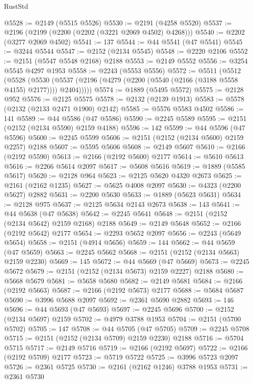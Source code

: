 \begin{lexlean}{RustStd}
\begin{coremodule}
@5528 := @2149 (@5515 @5526)
@5530 := @2191 (@4258 @5520)
@5537 := @2196 (@2199 (@2200 (@2202 (@3221 @2069 @4502) @4268)))
@5540 := @2202 (@3277 @2069 @4502)
@5541 := 137
@5544 := @44 @5541 (@47 @5541)
@5545 := @3244 @5544
@5547 := @2152 (@2134 @5545)
@5548 := @2220 @2106
@5552 := @2151 (@5547 @5548 @2168) @2188
@5553 := @2149 @5552
@5556 := @3254 @5545 @4297 @1953
@5558 := @2243 (@5553 @5556)
@5572 := @5511
    (@5512
      (@5528
        (@5530 (@5537 (@2196 (@4279 (@2200 (@5540 (@2166 (@3188 @5558 @4155) @2177)))) @2404)))))
@5574 := @1889 (@5495 @5572)
@5575 := @2128 @952
@5576 := @2125 @5575
@5578 := @2132 (@2139 @1913)
@5583 := @5578 (@2132 (@2133 @2471 @1900) @2142)
@5585 := @5576 @5583 @4502
@5586 := 141
@5589 := @44 @5586 (@47 @5586)
@5590 := @2245 @5589
@5595 := @2151 (@2152 (@2134 @5590) @2159 @4188)
@5596 := 142
@5599 := @44 @5596 (@47 @5596)
@5600 := @2245 @5599
@5606 := @2151 (@2152 (@2134 @5600) @2159 @2257) @2188
@5607 := @5595 @5606
@5608 := @2149 @5607
@5610 := @2166 (@2192 @5590)
@5613 := @2166 (@2192 @5600) @2177
@5614 := @5610 @5613
@5616 := @2266 @5614 @2097
@5617 := @5608 @5616
@5619 := @1889 (@5585 @5617)
@5620 := @2128 @964
@5623 := @2125 @5620 @4320 @2673
@5625 := @2161 (@2162 @1235)
@5627 := @5625 @4008 @2097
@5630 := @4323 (@2200 @5627) @2882
@5631 := @2200 @5630
@5633 := @1889 (@5623 @5631)
@5634 := @2128 @975
@5637 := @2125 @5634 @2143 @2673
@5638 := 143
@5641 := @44 @5638 (@47 @5638)
@5642 := @2245 @5641
@5648 := @2151 (@2152 (@2134 @5642) @2159 @2168) @2188
@5649 := @2149 @5648
@5652 := @2166 (@2192 @5642) @2177
@5654 := @2293 @5652 @2097
@5656 := @2243 (@5649 @5654)
@5658 := @2151 (@4914 @5656)
@5659 := 144
@5662 := @44 @5659 (@47 @5659)
@5663 := @2245 @5662
@5668 := @2151 (@2152 (@2134 @5663) @2159 @2230)
@5669 := 145
@5672 := @44 @5669 (@47 @5669)
@5673 := @2245 @5672
@5679 := @2151 (@2152 (@2134 @5673) @2159 @2227) @2188
@5680 := @5668 @5679
@5681 := @5658 @5680
@5682 := @2149 @5681
@5684 := @2166 (@2192 @5663)
@5687 := @2166 (@2192 @5673) @2177
@5688 := @5684 @5687
@5690 := @3996 @5688 @2097
@5692 := @2361 @5690 @2882
@5693 := 146
@5696 := @44 @5693 (@47 @5693)
@5697 := @2245 @5696
@5700 := @2152 (@2134 @5697) @2159
@5702 := @4979 @3788 @1953
@5704 := @2151 (@5700 @5702)
@5705 := 147
@5708 := @44 @5705 (@47 @5705)
@5709 := @2245 @5708
@5715 := @2151 (@2152 (@2134 @5709) @2159 @2230) @2188
@5716 := @5704 @5715
@5717 := @2149 @5716
@5719 := @2166 (@2192 @5697)
@5722 := @2166 (@2192 @5709) @2177
@5723 := @5719 @5722
@5725 := @3996 @5723 @2097
@5726 := @2361 @5725
@5730 := @2161 (@2162 @1246) @3788 @1953
@5731 := @2361 @5730

\end{coremodule}
\end{lexlean}
